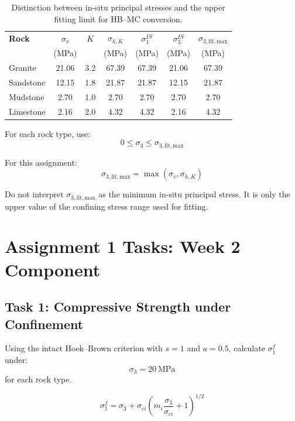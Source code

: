 \documentclass[a4paper,12pt]{article}
\begin{document}
\begin{table}[H]
\centering
\small
\begin{tabular}{l c c c c c c}
\toprule
\textbf{Rock} & \(\sigma_v\) & \(K\) & \(\sigma_{h,K}\) & \(\sigma_1^{IS}\) & \(\sigma_3^{IS}\) & \(\sigma_{3,\mathrm{fit,max}}\) \\
 & (MPa) &  & (MPa) & (MPa) & (MPa) & (MPa) \\
\midrule
Granite   & 21.06 & 3.2 & 67.39 & 67.39 & 21.06 & 67.39 \\
Sandstone & 12.15 & 1.8 & 21.87 & 21.87 & 12.15 & 21.87 \\
Mudstone  & 2.70  & 1.0 & 2.70  & 2.70  & 2.70  & 2.70  \\
Limestone & 2.16  & 2.0 & 4.32  & 4.32  & 2.16  & 4.32  \\
\bottomrule
\end{tabular}
\caption{Distinction between in-situ principal stresses and the upper fitting limit for HB--MC conversion.}
\end{table}

\begin{calcbox}
For each rock type, use:
\[
0 \leq \sigma_3 \leq \sigma_{3,\mathrm{fit,max}}
\]

For this assignment:
\[
\sigma_{3,\mathrm{fit,max}}=\max(\sigma_v,\sigma_{h,K})
\]

Do not interpret \(\sigma_{3,\mathrm{fit,max}}\) as the minimum in-situ principal stress.
It is only the upper value of the confining stress range used for fitting.
\end{calcbox}

\section{Assignment 1 Tasks: Week 2 Component}

\subsection{Task 1: Compressive Strength under Confinement}

Using the intact Hoek--Brown criterion with \(s=1\) and \(a=0.5\), calculate
\(\sigma_1^f\) under:
\[
\sigma_3 = 20~\text{MPa}
\]
for each rock type.

\[
\sigma_1^f =
\sigma_3 + \sigma_{ci}
\left(
m_i\frac{\sigma_3}{\sigma_{ci}} + 1
\right)^{1/2}
\]
\end{document}

